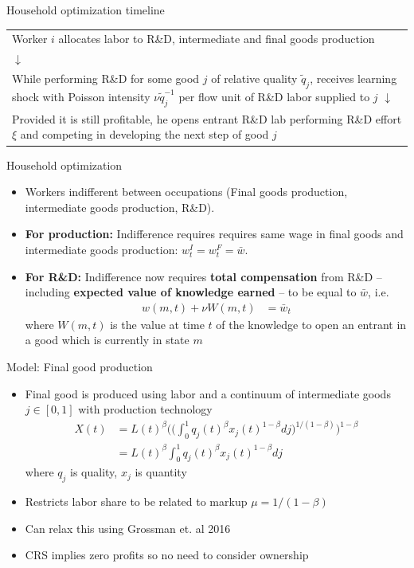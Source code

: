 \documentclass[english,usenames,dvipsnames]{beamer}
\begin{document}
\begin{frame}{Household optimization timeline}
\begin{table}
\begin{tabular}{p{}}
	\centering
	Worker $i$ allocates labor to R\&D, intermediate and final goods production \\
	$\downarrow$\\
	While performing R\&D for some good $j$ of relative quality $\tilde{q}_j$, receives learning shock with Poisson intensity $\nu \tilde{q}_j^{-1}$ per flow unit of R\&D labor supplied to $j$
	$\downarrow$\\
	Provided it is still profitable, he opens entrant R\&D lab performing R\&D effort $\xi$ and competing in developing the next step of good $j$
\end{tabular}
\end{table}
\end{frame}

\begin{frame}{Household optimization}
\small
\begin{itemize}
\item Workers indifferent between occupations (Final goods production, intermediate goods production, R\&D). 
\item \textbf{For production:} Indifference requires requires same wage in final goods and intermediate goods production: $w_t^I = w_t^F = \bar{w}$.
\item \textbf{For R\&D:} Indifference now requires \textbf{total compensation} from R\&D -- including \textbf{expected value of knowledge earned} -- to be equal to $\bar{w}$, i.e.
\begin{align*}
w(m,t) + \nu W(m,t) &= \bar{w}_t
\end{align*}
where $W(m,t)$ is the value at time $t$ of the knowledge to open an entrant in a good which is currently in state $m$
\end{itemize}
\end{frame}

\begin{frame}{Model: Final good production}
\begin{itemize}
	\item Final good is produced using labor and a continuum of intermediate goods $j\in[0,1]$ with production technology
	\begin{align*}
	X(t) &= L(t)^{\beta}\Bigg(\Big(\int_0^1 q_j(t)^\beta 
	x_j(t)^{1-\beta}dj \Big)^{1/(1-\beta)}\Bigg)^{1-\beta} \\
	&=  L(t)^{\beta}\int_0^1 q_j(t)^\beta x_j(t)^{1-\beta}dj
	\end{align*}
	where $q_j$ is quality, $x_j$ is quantity
	\item Restricts labor share to be related to markup $\mu = 1/(1-\beta)$
	\item Can relax this using Grossman et. al 2016
	\item CRS implies zero profits so no need to consider ownership
\end{itemize}
\end{frame}
\end{document}

